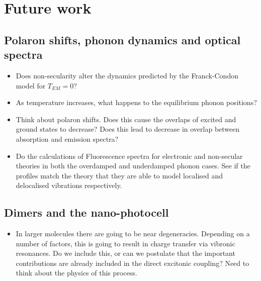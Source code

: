 \documentclass[]{article}
\begin{document}
\section{Future work}

\subsection{Polaron shifts, phonon dynamics and optical spectra}

\begin{itemize}
	\item Does non-secularity alter the dynamics predicted by the Franck-Condon model for $T_{EM}=0$?
	\item As temperature increases, what happens to the equilibrium phonon positions?
	\item Think about polaron shifts. Does this cause the overlaps of excited and ground states to decrease? Does this lead to decrease in overlap between absorption and emission spectra?
	\item Do the calculations of Fluorescence spectra for electronic and non-secular theories in both the overdamped and underdamped phonon cases. See if the profiles match the theory that they are able to model localised and delocalised vibrations respectively.
\end{itemize}

\subsection{Dimers and the nano-photocell}
\begin{itemize}
	\item In larger molecules there are going to be near degeneracies. Depending on a number of factors, this is going to result in charge transfer via vibronic resonances. Do we include this, or can we postulate that the important contributions are already included in the direct excitonic coupling? Need to think about the physics of this process.
\end{itemize}


\end{document}
